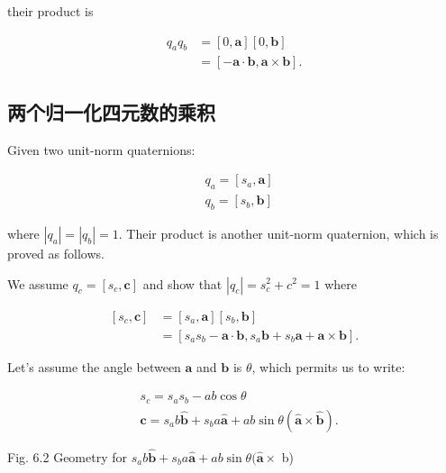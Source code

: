 their product is

$$
    \begin{aligned}
        q_{a} q_{b} & =[0, \mathbf{a}][0, \mathbf{b}]                                 \\
                    & =[-\mathbf{a} \cdot \mathbf{b}, \mathbf{a} \times \mathbf{b}] .
    \end{aligned}
$$

\subsection{两个归一化四元数的乘积}
Given two unit-norm quaternions:

$$
    \begin{aligned}
         & q_{a}=\left[s_{a}, \mathbf{a}\right] \\
         & q_{b}=\left[s_{b}, \mathbf{b}\right]
    \end{aligned}
$$

where $\left|q_{a}\right|=\left|q_{b}\right|=1$. Their product is another unit-norm quaternion, which is proved as follows.

We assume $q_{c}=\left[s_{c}, \mathbf{c}\right]$ and show that $\left|q_{c}\right|=s_{c}^{2}+c^{2}=1$ where

$$
    \begin{aligned}
        {\left[s_{c}, \mathbf{c}\right] } & =\left[s_{a}, \mathbf{a}\right]\left[s_{b}, \mathbf{b}\right]                                                           \\
                                          & =\left[s_{a} s_{b}-\mathbf{a} \cdot \mathbf{b}, s_{a} \mathbf{b}+s_{b} \mathbf{a}+\mathbf{a} \times \mathbf{b}\right] .
    \end{aligned}
$$

Let's assume the angle between $\mathbf{a}$ and $\mathbf{b}$ is $\theta$, which permits us to write:

$$
    \begin{aligned}
         & s_{c}=s_{a} s_{b}-a b \cos \theta                                                                                        \\
         & \mathbf{c}=s_{a} b \hat{\mathbf{b}}+s_{b} a \hat{\mathbf{a}}+a b \sin \theta(\hat{\mathbf{a}} \times \hat{\mathbf{b}}) .
    \end{aligned}
$$

Fig. 6.2 Geometry for $s_{a} b \hat{\mathbf{b}}+s_{b} a \hat{\mathbf{a}}+a b \sin \theta(\hat{\mathbf{a}} \times$ b)

